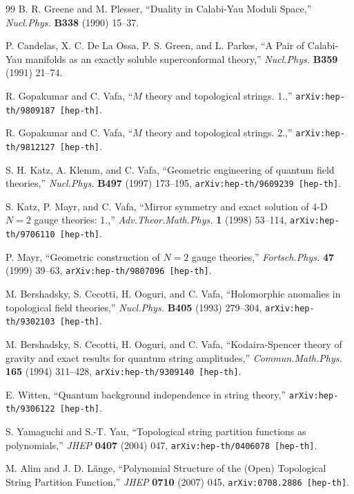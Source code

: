 \begin{thebibliography}{99}
B. R. Greene and M. Plesser, ``Duality in Calabi-Yau Moduli Space,'' \textit{Nucl.Phys.}
\textbf{B338} (1990) 15--37.

P. Candelas, X. C. De La Ossa, P. S. Green, and L. Parkes, ``A Pair of Calabi-Yau manifolds
as an exactly soluble superconformal theory,'' \textit{Nucl.Phys.} \textbf{B359} (1991)
21--74.

R. Gopakumar and C. Vafa, ``$M$ theory and topological strings. 1.,''
\texttt{arXiv:hep-th/9809187 [hep-th]}.

R. Gopakumar and C. Vafa, ``$M$ theory and topological strings. 2.,''
\texttt{arXiv:hep-th/9812127 [hep-th]}.

S. H. Katz, A. Klemm, and C. Vafa, ``Geometric engineering of quantum field theories,''
\textit{Nucl.Phys.} \textbf{B497} (1997) 173--195,
\texttt{arXiv:hep-th/9609239 [hep-th]}.

S. Katz, P. Mayr, and C. Vafa, ``Mirror symmetry and exact solution of 4-D $N=2$ gauge
theories: 1.,'' \textit{Adv.Theor.Math.Phys.} \textbf{1} (1998) 53--114,
\texttt{arXiv:hep-th/9706110 [hep-th]}.

P. Mayr, ``Geometric construction of $N=2$ gauge theories,'' \textit{Fortsch.Phys.}
\textbf{47} (1999) 39--63, \texttt{arXiv:hep-th/9807096 [hep-th]}.

M. Bershadsky, S. Cecotti, H. Ooguri, and C. Vafa, ``Holomorphic anomalies in topological
field theories,'' \textit{Nucl.Phys.} \textbf{B405} (1993) 279--304,
\texttt{arXiv:hep-th/9302103 [hep-th]}.

M. Bershadsky, S. Cecotti, H. Ooguri, and C. Vafa, ``Kodaira-Spencer theory of gravity and
exact results for quantum string amplitudes,'' \textit{Commun.Math.Phys.} \textbf{165}
(1994) 311--428, \texttt{arXiv:hep-th/9309140 [hep-th]}.

E. Witten, ``Quantum background independence in string theory,''
\texttt{arXiv:hep-th/9306122 [hep-th]}.


S. Yamaguchi and S.-T. Yau, ``Topological string partition functions as polynomials,''
\textit{JHEP} \textbf{0407} (2004) 047, \texttt{arXiv:hep-th/0406078 [hep-th]}.

M. Alim and J. D. L\"ange, ``Polynomial Structure of the (Open) Topological String
Partition Function,'' \textit{JHEP} \textbf{0710} (2007) 045,
\texttt{arXiv:0708.2886 [hep-th]}.


\end{thebibliography}
